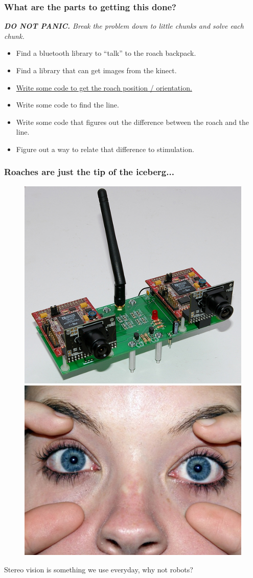\documentclass[compress]{beamer}
\begin{document}
\begin{frame}
  \frametitle{What are the parts to getting this done?}
   \textit{\textbf{DO NOT PANIC.} Break the problem down to little chunks and solve each chunk.}
  \begin{itemize}
    \item Find a bluetooth library to ``talk'' to the roach backpack.
    \item Find a library that can get images from the kinect.
    \item \href{http://www.simplecv.org}{Write some code to get the roach position / orientation.}
    \item Write some code to find the line.
    \item Write some code that figures out the difference between the roach and the line.
    \item Figure out a way to relate that difference to stimulation.
  \end{itemize}
\end{frame}
\begin{frame}
  \frametitle{Roaches are just the tip of the iceberg...}
  \begin{figure}
    \includegraphics[width=0.35\linewidth]{stereo.jpg}
    \quad
    \includegraphics[width=0.35\linewidth]{eyes.jpg}
  \end{figure}     
  Stereo vision is something we use everyday, why not robots?
\end{frame}
\end{document}

